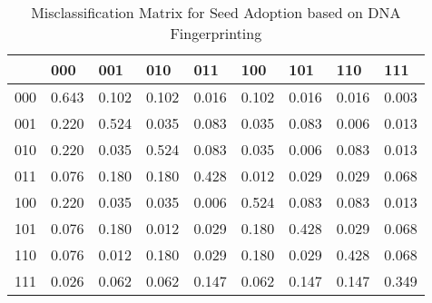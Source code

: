 \begin{table}
\caption{Misclassification Matrix for Seed Adoption based on DNA Fingerprinting}
\label{tab:cm}
\begin{tabular}{lllllllll}
\toprule
 & 000 & 001 & 010 & 011 & 100 & 101 & 110 & 111 \\
\midrule
000 & 0.643 & 0.102 & 0.102 & 0.016 & 0.102 & 0.016 & 0.016 & 0.003 \\
001 & 0.220 & 0.524 & 0.035 & 0.083 & 0.035 & 0.083 & 0.006 & 0.013 \\
010 & 0.220 & 0.035 & 0.524 & 0.083 & 0.035 & 0.006 & 0.083 & 0.013 \\
011 & 0.076 & 0.180 & 0.180 & 0.428 & 0.012 & 0.029 & 0.029 & 0.068 \\
100 & 0.220 & 0.035 & 0.035 & 0.006 & 0.524 & 0.083 & 0.083 & 0.013 \\
101 & 0.076 & 0.180 & 0.012 & 0.029 & 0.180 & 0.428 & 0.029 & 0.068 \\
110 & 0.076 & 0.012 & 0.180 & 0.029 & 0.180 & 0.029 & 0.428 & 0.068 \\
111 & 0.026 & 0.062 & 0.062 & 0.147 & 0.062 & 0.147 & 0.147 & 0.349 \\
\bottomrule
\end{tabular}
\end{table}
